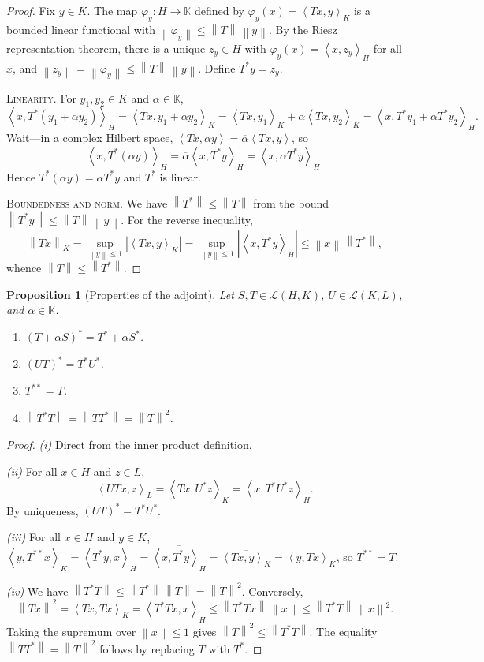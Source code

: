 \documentclass[a4paper,12pt]{book}
\newcommand{\K}{\mathbb{K}}
\newcommand{\norm}[1]{\left\| #1 \right\|}
\newcommand{\abs}[1]{\left| #1 \right|}
\newcommand{\inner}[2]{\left\langle #1, #2 \right\rangle}
\theoremstyle{definition}
\theoremstyle{plain}
\newtheorem{proposition}[definition]{Proposition}
\theoremstyle{remark}
\begin{document}
\begin{proof}
Fix $y\in K$. The map $\varphi_y\colon H\to\K$ defined by $\varphi_y(x)=\inner{Tx}{y}_K$
is a bounded linear functional with $\norm{\varphi_y}\leq\norm{T}\,\norm{y}$.
By the Riesz representation theorem, there
is a unique $z_y\in H$ with $\varphi_y(x)=\inner{x}{z_y}_H$ for all $x$, and
$\norm{z_y}=\norm{\varphi_y}\leq\norm{T}\,\norm{y}$. Define $T^*y = z_y$.

\textsc{Linearity.} For $y_1,y_2\in K$ and $\alpha\in\K$,
\[
  \inner{x}{T^*(y_1+\alpha y_2)}_H
  = \inner{Tx}{y_1+\alpha y_2}_K
  = \inner{Tx}{y_1}_K + \overline{\alpha}\inner{Tx}{y_2}_K
  = \inner{x}{T^*y_1 + \overline{\alpha}T^*y_2}_H.
\]
Wait---in a complex Hilbert space, $\inner{Tx}{\alpha y} = \overline{\alpha}\inner{Tx}{y}$,
so
\[
  \inner{x}{T^*(\alpha y)}_H = \overline{\alpha}\inner{x}{T^*y}_H
  = \inner{x}{\alpha T^*y}_H.
\]
Hence $T^*(\alpha y)=\alpha T^*y$ and $T^*$ is linear.

\textsc{Boundedness and norm.} We have $\norm{T^*}\leq\norm{T}$ from the
bound $\norm{T^*y}\leq\norm{T}\,\norm{y}$. For the reverse inequality,
\[
  \norm{Tx}_K = \sup_{\norm{y}\leq 1}\abs{\inner{Tx}{y}_K}
  = \sup_{\norm{y}\leq 1}\abs{\inner{x}{T^*y}_H}
  \leq \norm{x}\,\norm{T^*},
\]
whence $\norm{T}\leq\norm{T^*}$.
\end{proof}

\begin{proposition}[Properties of the adjoint]\label{prop:adjoint-props}
Let $S,T\in\mathcal{L}(H,K)$, $U\in\mathcal{L}(K,L)$, and $\alpha\in\K$.
\begin{enumerate}[label=(\roman*)]
  \item $(T+\alpha S)^* = T^* + \overline{\alpha}S^*$.
  \item $(UT)^* = T^*U^*$.
  \item $T^{**} = T$.
  \item $\norm{T^*T} = \norm{TT^*} = \norm{T}^2$.
\end{enumerate}
\end{proposition}

\begin{proof}
\emph{(i)} Direct from the inner product definition.

\emph{(ii)} For all $x\in H$ and $z\in L$,
\[
  \inner{UTx}{z}_L = \inner{Tx}{U^*z}_K = \inner{x}{T^*U^*z}_H.
\]
By uniqueness, $(UT)^*=T^*U^*$.

\emph{(iii)} For all $x\in H$ and $y\in K$,
$\inner{y}{T^{**}x}_K = \inner{T^*y}{x}_H = \overline{\inner{x}{T^*y}_H}
= \overline{\inner{Tx}{y}_K} = \inner{y}{Tx}_K$, so $T^{**}=T$.

\emph{(iv)} We have $\norm{T^*T}\leq\norm{T^*}\,\norm{T}=\norm{T}^2$. Conversely,
\[
  \norm{Tx}^2 = \inner{Tx}{Tx}_K = \inner{T^*Tx}{x}_H
  \leq \norm{T^*Tx}\,\norm{x}
  \leq \norm{T^*T}\,\norm{x}^2.
\]
Taking the supremum over $\norm{x}\leq 1$ gives $\norm{T}^2\leq\norm{T^*T}$.
The equality $\norm{TT^*}=\norm{T}^2$ follows by replacing $T$ with $T^*$.
\end{proof}
\end{document}
